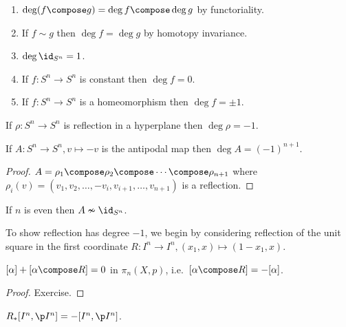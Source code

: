 \documentclass[a4paper]{article}
\renewcommand{\b}{\p}
\begin{document}
\begin{proposition}\leavevmode
  \begin{enumerate}
  \item \(\deg (f \compose g) = \deg f \compose \deg g\) by functoriality.
  \item If \(f \sim g\) then \(\deg f = \deg g\) by homotopy invariance.
  \item \(\deg \id_{S^n} = 1\).
  \item If \(f: S^n \to S^n\) is constant then \(\deg f = 0\).
  \item If \(f: S^n \to S^n\) is a homeomorphism then \(\deg f = \pm 1\).
  \end{enumerate}
\end{proposition}

\begin{proposition}
  \label{prop:degree of reflection of sphere}
  If \(\rho: S^n \to S^n\) is reflection in a hyperplane then \(\deg \rho = -1\).
\end{proposition}

\begin{corollary}
  If \(A: S^n \to S^n, v \mapsto -v\) is the antipodal map then \(\deg A = (-1)^{n + 1}\).
\end{corollary}

\begin{proof}
  \(A = \rho_1 \compose \rho_2 \compose \cdots \compose \rho_{n + 1}\) where \(\rho_i(v) = (v_1, v_2, \dots, -v_i, v_{i + 1}, \dots, v_{n + 1})\) is a reflection.
\end{proof}

\begin{corollary}
  If \(n\) is even then \(A \nsim \id_{S^n}\).
\end{corollary}

To show reflection has degree \(-1\), we begin by considering reflection of the unit square in the first coordinate \(R: I^n \to I^n, (x_1, x) \mapsto (1 - x_1, x)\).

\begin{lemma}
  \([\alpha] + [\alpha \compose R] = 0\) in \(\pi_n(X, p)\), i.e.\ \([\alpha \compose R] = -[\alpha]\).
\end{lemma}

\begin{proof}
  Exercise.
\end{proof}

\begin{corollary}
  \(R_*[I^n, \b I^n] = -[I^n, \b I^n]\).
\end{corollary}
\end{document}
